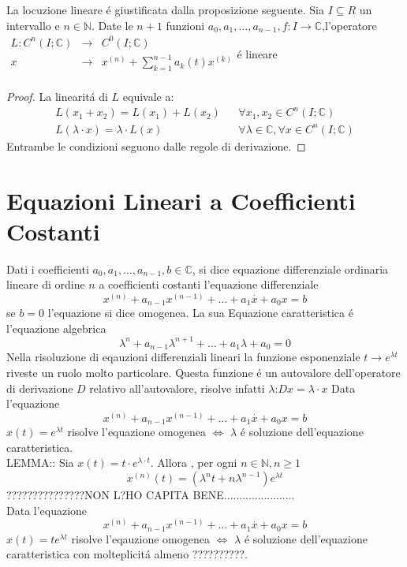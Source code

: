 \observation
La locuzione lineare \'e giustificata dalla proposizione seguente.
\proposition
Sia $I\subseteq R$ un intervallo e $n\in\mathbb{N}$. Date le $n+1$ funzioni $a_0,a_1,\ldots,a_{n-1},f:I\to\mathbb{C}$,l'operatore 
$\begin{array}{rcl} 
L: C^n(I;\mathbb{C}) & \to & C^0(I;\mathbb{C}) \\
x & \to & x^{(n)}+\sum\limits_{k=1}^{n-1}a_k(t)x^{(k)} \\ 
\end{array}$\'e lineare
\begin{proof}
	La linearit\'a di $L$ equivale a:
	$$ \begin{matrix}L(x_1+x_2)=L(x_1)+L(x_2) && \forall x_1,x_2\in C^n(I;\mathbb{C})\\L(\lambda\cdot x)=\lambda\cdot L(x) && \forall\lambda\in\mathbb{C}, \forall x\in C^n(I;\mathbb{C})\end{matrix} $$
	Entrambe le condizioni  seguono dalle regole di derivazione.
\end{proof}
\section{Equazioni Lineari a Coefficienti Costanti}
Dati i coefficienti $a_0,a_1,\ldots,a_{n-1},b\in\mathbb{C}$, si dice equazione differenziale ordinaria lineare di ordine $n$ a coefficienti costanti l'equazione differenziale
$$x^{(n)}+a_{n-1}x^{(n-1)}+\ldots+a_1\overset{\cdot}{x}+a_0x=b$$
se $b=0$ l'equazione si dice omogenea. La sua Equazione caratteristica \'e l'equazione algebrica
$$\lambda^n+a_{n-1}\lambda^{n+1}+\ldots+a_1\lambda+a_0=0$$ 
\observation
Nella risoluzione di eqauzioni differenziali lineari la funzione esponenziale $t\to e^{\lambda t}$ riveste un ruolo molto particolare. Questa funzione \'e un autovalore dell'operatore di derivazione $D$ relativo all'autovalore, risolve infatti $\lambda$:$Dx=\lambda\cdot x$ 
\proposition
Data l'equazione
$$x^{(n)}+a_{n-1}x^{(n-1)}+\ldots+a_1\overset{\cdot}{x}+a_0x=b$$
$x(t)=e^{\lambda t}$ risolve l'equazione omogenea $\Leftrightarrow$ $\lambda$ \'e soluzione dell'equazione caratteristica.\\

LEMMA:: Sia $x(t)=t\cdot e^{\lambda\cdot t}$. Allora , per ogni $n\in\mathbb{N}, n\ge 1$
$$x^{(n)}(t)=\left(\lambda^nt+n\lambda^{n-1}\right)e^{\lambda t}$$
???????????????NON L?HO CAPITA BENE.......................\\
\proposition
Data l'equazione 
$$x^{(n)}+a_{n-1}x^{(n-1)}+\ldots+a_1\overset{\cdot}{x}+a_0x=b$$
$x(t)=te^{\lambda t}$ risolve l'eqauzione omogenea $\Leftrightarrow$ $\lambda$ \'e soluzione dell'equazione caratteristica con molteplicit\'a almeno ??????????.






